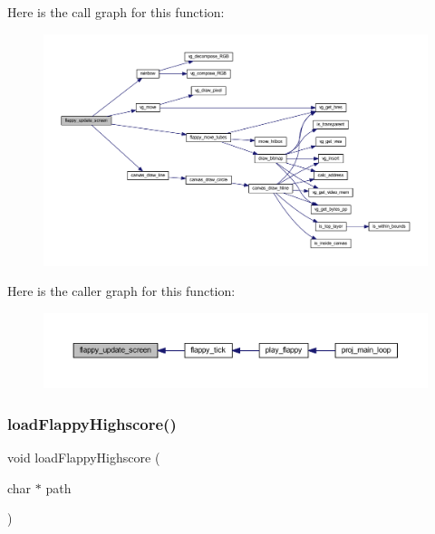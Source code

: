 Here is the call graph for this function\+:\nopagebreak
\begin{figure}[H]
\begin{center}
\leavevmode
\includegraphics[width=350pt]{group__flappy_gaf8e964390506e60ce524b539e98ff4fc_cgraph}
\end{center}
\end{figure}
Here is the caller graph for this function\+:\nopagebreak
\begin{figure}[H]
\begin{center}
\leavevmode
\includegraphics[width=350pt]{group__flappy_gaf8e964390506e60ce524b539e98ff4fc_icgraph}
\end{center}
\end{figure}
\mbox{\label{group__flappy_ga48334c3029c7f0bbe6b07d3423a6702e}} 
\subsubsection{\texorpdfstring{load\+Flappy\+Highscore()}{loadFlappyHighscore()}}
{\footnotesize\ttfamily void load\+Flappy\+Highscore (\begin{DoxyParamCaption}\item[{char $\ast$}]{path }\end{DoxyParamCaption})}



